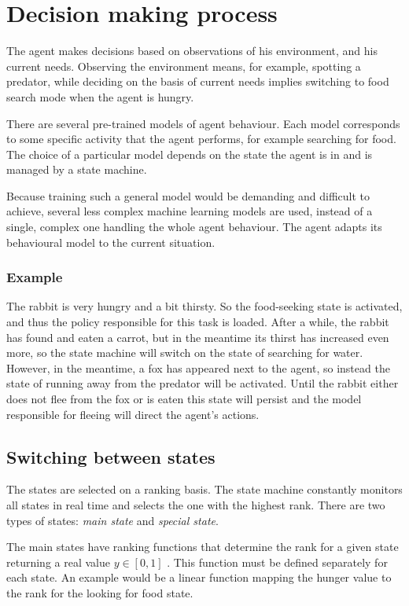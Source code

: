\section{Decision making process}
The agent makes decisions based on observations of his environment, and his current needs. Observing the environment means, for example, spotting a predator, while deciding on the basis of current needs implies switching to food search mode when the agent is hungry. 

There are several pre-trained models of agent behaviour. Each model corresponds to some specific activity that the agent performs, for example searching for food. The choice of a particular model depends on the state the agent is in and is managed by a state machine.

Because training such a general model would be demanding and difficult to achieve, several less complex machine learning models are used, instead of a single, complex one handling the whole agent behaviour. The agent adapts its behavioural model to the current situation.

\subsubsection{Example}
The rabbit is very hungry and a bit thirsty. So the food-seeking state is activated, and thus the policy responsible for this task is loaded. After a while, the rabbit has found and eaten a carrot, but in the meantime its thirst has increased even more, so the state machine will switch on the state of searching for water. However, in the meantime, a fox has appeared next to the agent, so instead the state of running away from the predator will be activated. Until the rabbit either does not flee from the fox or is eaten this state will persist and the model responsible for fleeing will direct the agent's actions.

\subsection{Switching between states}
\label{switchingStates}
The states are selected on a ranking basis. The state machine constantly monitors all states in real time and selects the one with the highest rank. There are two types of states: \emph{main state} and \emph{special state}. 

The main states have ranking functions that determine the rank for a given state returning a real value $y \in [0, 1]$ . This function must be defined separately for each state. An example would be a linear function mapping the hunger value to the rank for the looking for food state.

